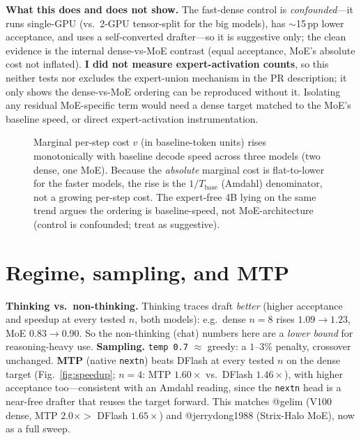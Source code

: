 \documentclass[11pt]{article}
\begin{document}
\textbf{What this does and does not show.} The fast-dense control is \emph{confounded}---it runs single-GPU (vs.\ 2-GPU tensor-split
for the big models), has $\sim$15\,pp lower acceptance, and uses a self-converted drafter---so it is suggestive only; the clean
evidence is the internal dense-vs-MoE contrast (equal acceptance, MoE's absolute cost not inflated). \textbf{I did not measure
expert-activation counts}, so this neither tests nor excludes the expert-union mechanism in the PR description; it only shows the
dense-vs-MoE ordering can be reproduced without it. Isolating any residual MoE-specific term would need a dense target matched to the
MoE's baseline speed, or direct expert-activation instrumentation.

\begin{figure}[h]
\centering
{}
\caption{Marginal per-step cost $v$ (in baseline-token units) rises monotonically with baseline decode speed across three models
(two dense, one MoE). Because the \emph{absolute} marginal cost is flat-to-lower for the faster models, the rise is the
$1/T_{\text{base}}$ (Amdahl) denominator, not a growing per-step cost. The expert-free 4B lying on the same trend argues the ordering
is baseline-speed, not MoE-architecture (control is confounded; treat as suggestive).}
\label{fig:amdahl}
\end{figure}

\section{Regime, sampling, and MTP}
\textbf{Thinking vs.\ non-thinking.} Thinking traces draft \emph{better} (higher acceptance and speedup at every tested $n$, both
models): e.g.\ dense $n{=}8$ rises $1.09\to1.23$, MoE $0.83\to0.90$. So the non-thinking (chat) numbers here are a \emph{lower bound}
for reasoning-heavy use. \textbf{Sampling.} \texttt{temp 0.7} $\approx$ greedy: a $1\text{--}3\%$ penalty, crossover unchanged.
\textbf{MTP} (native \texttt{nextn}) beats DFlash at every tested $n$ on the dense target (Fig.~\ref{fig:speedup}; $n{=}4$: MTP
$1.60\times$ vs.\ DFlash $1.46\times$), with higher acceptance too---consistent with an Amdahl reading, since the \texttt{nextn} head
is a near-free drafter that reuses the target forward. This matches @gelim (V100 dense, MTP $2.0\times>$ DFlash $1.65\times$) and
@jerrydong1988 (Strix-Halo MoE), now as a full sweep.
\end{document}
